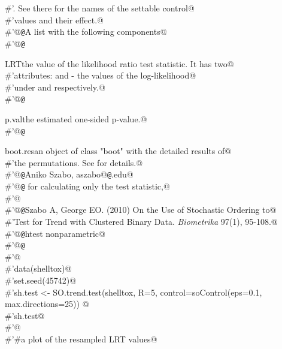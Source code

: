 \documentclass[reqno]{amsart}
\begin{document}
\begin{flushleft}
\begin{list}{}{}
\mbox{}\verb@#'.  See there for the names of the settable control@\\
\mbox{}\verb@#'values and their effect.@\\
\mbox{}\verb@#'@{\tt @}\verb@return A list with the following components@\\
\mbox{}\verb@#'@{\tt @}\verb@return \item{LRT}{the value of the likelihood ratio test statistic. It has two@\\
\mbox{}\verb@#'attributes:  and  - the values of the log-likelihood@\\
\mbox{}\verb@#'under  and  respectively.}@\\
\mbox{}\verb@#'@{\tt @}\verb@return \item{p.val}{the estimated one-sided p-value.}@\\
\mbox{}\verb@#'@{\tt @}\verb@return \item{boot.res}{an object of class "boot" with the detailed results of@\\
\mbox{}\verb@#'the permutations.  See  for details.}@\\
\mbox{}\verb@#'@{\tt @}\verb@author Aniko Szabo, aszabo@{\tt @}\verb@mcw.edu@\\
\mbox{}\verb@#'@{\tt @}\verb@seealso {} for calculating only the test statistic,@\\
\mbox{}\verb@#'@\\
\mbox{}\verb@#'@{\tt @}\verb@references Szabo A, George EO. (2010) On the Use of Stochastic Ordering to@\\
\mbox{}\verb@#'Test for Trend with Clustered Binary Data. \emph{Biometrika} 97(1), 95-108.@\\
\mbox{}\verb@#'@{\tt @}\verb@keywords htest nonparametric@\\
\mbox{}\verb@#'@{\tt @}\verb@examples@\\
\mbox{}\verb@#'@\\
\mbox{}\verb@#'data(shelltox)@\\
\mbox{}\verb@#'set.seed(45742)@\\
\mbox{}\verb@#'sh.test <- SO.trend.test(shelltox, R=5, control=soControl(eps=0.1, max.directions=25)) @\\
\mbox{}\verb@#'sh.test@\\
\mbox{}\verb@#'@\\
\mbox{}\verb@#'#a plot of the resampled LRT values@\\

\end{list}
\end{flushleft}
\end{document}

